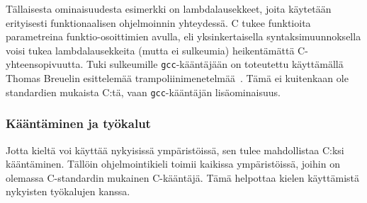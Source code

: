 Tällaisesta ominaisuudesta esimerkki on lambdalausekkeet, joita käytetään
erityisesti funktionaalisen ohjelmoinnin yhteydessä. C tukee funktioita
parametreina funktio-osoittimien avulla, eli yksinkertaisella
syntaksimuunnoksella voisi tukea lambdalausekkeita (mutta ei sulkeumia)
heikentämättä C-yhteensopivuutta. Tuki sulkeumille \texttt{gcc}-kääntäjään on
toteutettu käyttämällä Thomas Breuelin esittelemää
trampoliinimenetelmää~\citep{gccnested, cppclosure}. Tämä ei kuitenkaan ole
standardien mukaista C:tä, vaan \texttt{gcc}-kääntäjän lisäominaisuus.

%

\subsubsection{Kääntäminen ja työkalut}

Jotta kieltä voi käyttää nykyisissä ympäristöissä, sen tulee mahdollistaa C:ksi
kääntäminen. Tällöin ohjelmointikieli toimii kaikissa ympäristöissä, joihin on
olemassa C-standardin mukainen C-kääntäjä. Tämä helpottaa kielen käyttämistä
nykyisten työkalujen kanssa.


